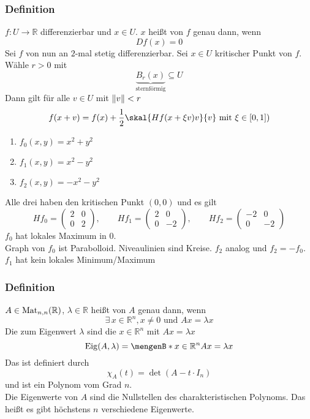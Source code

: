 \subsubsection{Definition} %
\label{ssub:definition}
$ f: U \to \mathbb{R} $  differenzierbar und $x \in U$. $x$ heißt  von $f$ genau dann, wenn \[
	Df(x)=0
\] 
Sei $f$ von nun an $2$-mal stetig differenzierbar. Sei $x \in U$ kritischer Punkt von $f$. \\
Wähle $r > 0$ mit 
\[
	\underset{\text{sternförmig}}{\underbrace{B_r(x)}}\subseteq U
\]
Dann gilt für alle $v \in U$ mit $\norm{v}<r$
\[
	f(x+v)=f(x)+\frac{1}{2}\skal{Hf(x+\xi v)v}{v} \text{ mit }\xi \in [0,1])
\]
\begin{enumerate}
	\item $f_0(x,y)=x^2+y^2$
	\item $f_1(x,y)=x^2-y^2$
	\item $f_2(x,y)=-x^2-y^2$
\end{enumerate}
Alle drei haben den kritischen Punkt $(0,0)$ und es gilt
\[
	Hf_0= \begin{pmatrix}
		2 & 0 \\ 0 & 2 
	\end{pmatrix} ,\qquad Hf_1=\begin{pmatrix}
		2 & 0 \\ 0 & -2
	\end{pmatrix} ,\qquad Hf_2=\begin{pmatrix}
		-2 & 0 \\ 0 & -2
	\end{pmatrix}
\] $f_0$ hat lokales Maximum in $0$. \\
Graph von $f_0$ ist Parabolloid. Niveaulinien sind Kreise. $f_2$ analog und $f_2 = -f_0$. \\
$f_1$ hat kein lokales Minimum/Maximum
\subsubsection{Definition} %
\label{ssub:definition}
$A \in \operatorname{Mat}_{n,n}(\mathbb{R})$, $\lambda \in \mathbb{R}$ heißt  von $A$ genau dann, wenn
\[
	\exists\,x \in \mathbb{R}^n, x \neq 0 \text{ und } Ax=\lambda x
\]
Die  zum Eigenwert $\lambda$ sind die $x \in \mathbb{R}^n$ mit $Ax=\lambda x$
\[
	\Eig(A,\lambda)= \set[x \in \mathbb{R}^n]{Ax=\lambda x}
\]
Das  ist definiert durch
\[
	\chi_A(t)=\det(A-t \cdot I_n)
\]
und ist ein Polynom vom Grad $n$. \\
Die Eigenwerte von $A$ sind die Nullstellen des charakteristischen Polynoms. Das heißt es gibt höchstens $n$ verschiedene Eigenwerte.
